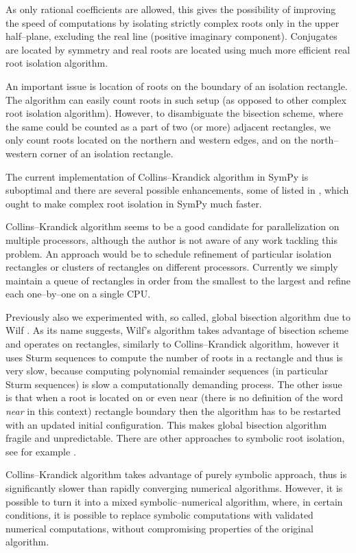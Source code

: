 As only rational coefficients are allowed, this gives the possibility of improving the speed
of computations by isolating strictly complex roots only in the upper half--plane, excluding
the real line (positive imaginary component). Conjugates are located by symmetry and real
roots are located using much more efficient real root isolation algorithm.

An important issue is location of roots on the boundary of an isolation rectangle. The
algorithm can easily count roots in such setup (as opposed to other complex root isolation
algorithm). However, to disambiguate the bisection scheme, where the same could be counted
as a part of two (or more) adjacent rectangles, we only count roots located on the northern
and western edges, and on the north--western corner of an isolation rectangle.

The current implementation of Collins--Krandick algorithm in SymPy is suboptimal and there
are several possible enhancements, some of listed in \cite{Collins1992infallible}, which ought
to make complex root isolation in SymPy much faster.

Collins--Krandick algorithm seems to be a good candidate for parallelization on multiple
processors, although the author is not aware of any work tackling this problem. An approach
would be to schedule refinement of particular isolation rectangles or clusters of rectangles
on different processors. Currently we simply maintain a queue of rectangles in order from
the smallest to the largest and refine each one--by--one on a single CPU.

Previously also we experimented with, so called, global bisection algorithm due to Wilf
\cite{Wilf1978bisection}. As its name suggests, Wilf's algorithm takes advantage of bisection
scheme and operates on rectangles, similarly to Collins--Krandick algorithm, however it uses
Sturm sequences to compute the number of roots in a rectangle and thus is very slow, because
computing polynomial remainder sequences (in particular Sturm sequences) is slow a computationally
demanding process. The other issue is that when a root is located on or even near (there is no
definition of the word \emph{near} in this context) rectangle boundary then the algorithm has to be
restarted with an updated initial configuration. This makes global bisection algorithm fragile
and unpredictable. There are other approaches to symbolic root isolation, see for example
\cite{Pinkert1976complex}.

Collins--Krandick algorithm takes advantage of purely symbolic approach, thus is significantly
slower than rapidly converging numerical algorithms. However, it is possible to turn it into a
mixed symbolic--numerical algorithm, where, in certain conditions, it is possible to replace
symbolic computations with validated numerical computations, without compromising properties
of the original algorithm.

